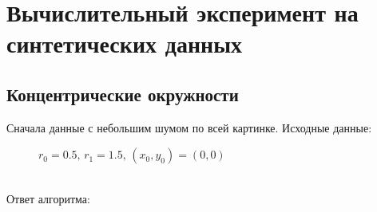 

\section{Вычислительный эксперимент на синтетических данных}
\subsection{Концентрические окружности}
Сначала данные с небольшим шумом по всей картинке. Исходные данные:  \begin{figure}[h!]
\caption{$r_0 = 0.5, \, r_1 = 1.5, \, (x_0, y_0) = (0, 0)$}
\end{figure} \\
Ответ алгоритма: \\
\begin{figure}[h!]
\end{figure}\\
